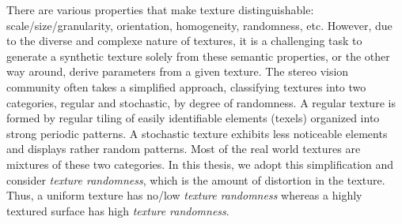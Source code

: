 
There are various properties that make texture distinguishable: scale/size/granularity, orientation, homogeneity, randomness, etc. However, due to the diverse and complexe nature of textures, it is a challenging task to generate a synthetic texture solely from these semantic properties, or the other way around, derive parameters from a given texture. The stereo vision community often takes a simplified approach, classifying textures into two categories, regular and stochastic, by degree of randomness. A regular texture is formed by regular tiling of easily identifiable elements (texels) organized into strong periodic patterns. A stochastic texture exhibits less noticeable elements and displays rather random patterns. Most of the real world textures are mixtures of these two categories. In this thesis, we adopt this simplification and consider \textit{texture randomness}, which is the amount of distortion in the texture. Thus, a uniform texture has no/low \textit{texture randomness} whereas a highly textured surface has high \textit{texture randomness}.



